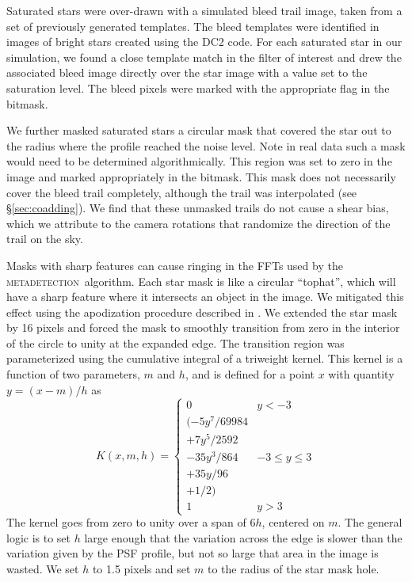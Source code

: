 \documentclass[twocolumn,twocolappendix,astrosym]{openjournal}
\newcommand{\mdet}{\textsc{metadetection}}
\begin{document}
Saturated stars were over-drawn with a simulated bleed trail image, taken from
a set of previously generated templates.  The bleed templates were identified
in images of bright stars created using the DC2 code.  For each saturated star
in our simulation, we found a close template match in the filter of interest
and drew the associated bleed image directly over the star image with a value
set to the saturation level. The bleed pixels were marked with the appropriate
flag in the bitmask.

We further masked saturated stars a circular mask that covered the star out to
the radius where the profile reached the noise level.  Note in real data such a
mask would need to be determined algorithmically.   This region was set to zero
in the image and marked appropriately in the bitmask.   This mask does not
necessarily cover the bleed trail completely, although the trail was
interpolated (see \S \ref{sec:coadding}).  We find that these unmasked trails
do not cause a shear bias, which we attribute to the camera rotations that
randomize the direction of the trail on the sky.

Masks with sharp features can cause ringing in the FFTs used by the \mdet\
algorithm.   Each star mask is like a circular ``tophat'', which will have a
sharp feature where it intersects an object in the image.  We mitigated this
effect using the apodization procedure described in \citet{BeckerMdetCoadd}. We
extended the star mask by 16 pixels and forced the mask to smoothly transition
from zero in the interior of the circle to unity at the expanded edge. The
transition region was parameterized using the cumulative integral of a
triweight kernel. This kernel is a function of two parameters, $m$ and $h$, and
is defined for a point $x$ with quantity $y = (x-m)/h$ as
\begin{equation}
K(x, m, h) = \begin{cases}
0 & y < -3 \\
(-5y^7 / 69984 \\
+ 7y^5 / 2592 \\
- 35y^3 / 864 & -3 \le y \le 3 \\
+ 35y / 96 \\
+ 1 / 2) \\
1 & y > 3
\end{cases}
\end{equation}
The kernel goes from zero to unity over a span of $6h$, centered on $m$.
The general logic is to set $h$ large enough that the variation across the edge is slower
than the variation given by the PSF profile, but not so large that area in the image is
wasted. We set $h$ to 1.5 pixels and set $m$ to the radius of the star mask hole.
\end{document}
